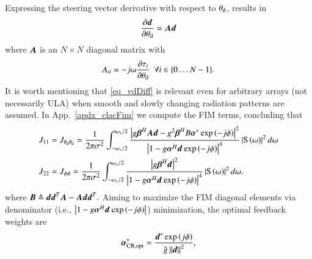 Expressing the steering vector derivative with respect to $\theta_{\text{d}}$, results in
\begin{equation}\label{eq_vdDiff}
\frac{\partial\boldsymbol{d}}{\partial\theta_{\text{d}}}=\boldsymbol{A}\boldsymbol{d}
\end{equation}
where $\boldsymbol{A}$ is an $N\times{}N$ diagonal matrix with
\[
A_{ii}=-j\omega\frac{\partial \tau_{i}}{\partial{\theta_{\text{d}}}}\ \  \forall{i\in\left\{{0\hdots{}N-1}\right\}}.
\]
It is worth mentioning that \eqref{eq_vdDiff} is relevant even for arbitrary arrays (not necessarily ULA) when smooth and slowly changing radiation patterns are assumed.
In App.~\ref{apdx_clacFim} we compute the FIM terms, concluding that
\begin{equation}
    \label{eqn_FIMelements}
    {
        \begin{split}
            &J_{11}=J_{\thetaD\thetaD}
            =
            \frac{1}{2\pi\sigma^{2}}\int_{-\omega_{s}/2}^{\omega_{s}/2}{\frac{
            \lBrace{g\vBetaH{}\vecnot{A}\vd-g^{2}\vBetaH{}B\vAlphaC\ePhi{-}}^{2}
            }{
            \lBrace{1-g\aHd\ePhi{-}}^{4}
            }\lBrace{\F{s}\rBrace{\omega}}^{2}d\omega}
            \\
            &J_{22}=J_{\phi\phi}
            =
            \frac{1}{2\pi\sigma^{2}}\int_{-\omega_{s}/2}^{\omega_{s}/2}{\frac{
            \lBrace{g\bHd}^{2}
            }{
            \lBrace{1-g\aHd\ePhi{-}}^{4}
            }\lBrace{\F{s}\rBrace{\omega}}^{2}d\omega}.
        \end{split}
    }
\end{equation}
where $\boldsymbol{B}\triangleq\boldsymbol{d}\boldsymbol{d}^{T}{}\boldsymbol{A}-\boldsymbol{A}\boldsymbol{d}\boldsymbol{d}^{T}.$ 
Aiming to maximize the FIM diagonal elements via denominator (i.e., $\left|{1-g\boldsymbol{\alpha}^{H}\boldsymbol{d}_{}\exp{\left({-j\phi}\right)}}\right|$) minimization, the optimal feedback weights are 
\begin{equation}\label{eq:alpha_beta_opt}
\boldsymbol{\alpha}^{\ast}_{\text{CB,opt}}=\frac{\boldsymbol{d}^{\ast}\exp\left({j\phi}\right)}{\hat{g}\left\Vert\boldsymbol{d}\right\Vert^2},
\end{equation}
